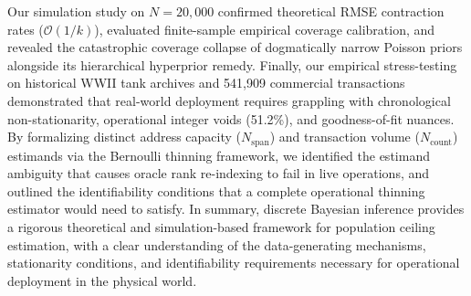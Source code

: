 \documentclass[10pt,a4paper]{article}
\begin{document}
Our simulation study on $N = 20,000$ confirmed theoretical RMSE contraction rates ($\mathcal{O}(1/k)$), evaluated finite-sample empirical coverage calibration, and revealed the catastrophic coverage collapse of dogmatically narrow Poisson priors alongside its hierarchical hyperprior remedy. Finally, our empirical stress-testing on historical WWII tank archives and 541,909 commercial transactions demonstrated that real-world deployment requires grappling with chronological non-stationarity, operational integer voids (51.2\%), and goodness-of-fit nuances. By formalizing distinct address capacity ($N_{\text{span}}$) and transaction volume ($N_{\text{count}}$) estimands via the Bernoulli thinning framework, we identified the estimand ambiguity that causes oracle rank re-indexing to fail in live operations, and outlined the identifiability conditions that a complete operational thinning estimator would need to satisfy. In summary, discrete Bayesian inference provides a rigorous theoretical and simulation-based framework for population ceiling estimation, with a clear understanding of the data-generating mechanisms, stationarity conditions, and identifiability requirements necessary for operational deployment in the physical world.
\end{document}
